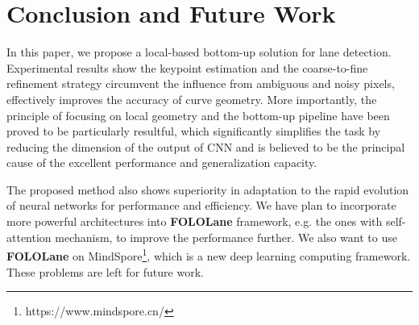 \documentclass[final]{cvpr}
\begin{document}
\thispagestyle{empty}
\section{Conclusion and Future Work}
In this paper, we propose a local-based bottom-up solution for lane detection. Experimental results show the keypoint estimation and the coarse-to-fine refinement strategy circumvent the influence from ambiguous and noisy pixels, effectively improves the accuracy of curve geometry. More importantly, the principle of focusing on local geometry and the bottom-up pipeline have been proved to be particularly resultful, which significantly simplifies the task by reducing the dimension of the output of CNN and is believed to be the principal cause of the excellent performance and generalization capacity.

The proposed method also shows superiority in adaptation to the rapid evolution of neural networks for performance and efficiency. We have plan to incorporate more powerful architectures into \textbf{FOLOLane} framework, e.g. the ones with self-attention mechanism, to improve the performance further. We also want to use \textbf{FOLOLane} on MindSpore\footnote{https://www.mindspore.cn/}, which is a new deep learning computing framework. These problems are left for future work.





{\small


\thispagestyle{empty}
}
\end{document}
